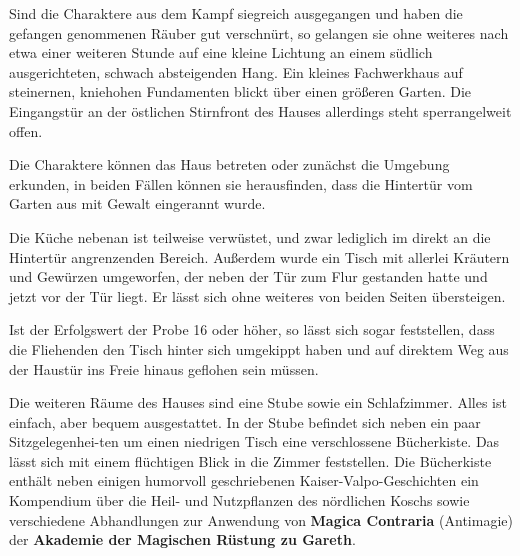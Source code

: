 



Sind die Charaktere aus dem Kampf siegreich ausgegangen und haben die gefangen genommenen Räuber gut verschnürt, so gelangen sie ohne weiteres nach etwa einer weiteren Stunde auf eine kleine Lichtung an einem südlich ausgerichteten, schwach absteigenden Hang. Ein kleines Fachwerkhaus auf steinernen, kniehohen Fundamenten blickt über einen größeren Garten. Die Eingangstür an der östlichen Stirnfront des Hauses allerdings steht sperrangelweit offen.


Die Charaktere können das Haus betreten oder zunächst die Umgebung erkunden, in beiden Fällen können sie herausfinden, dass die Hintertür vom Garten aus mit Gewalt eingerannt wurde.



Die Küche nebenan ist teilweise verwüstet, und zwar lediglich im direkt an die Hintertür angrenzenden Bereich. Außerdem wurde ein Tisch mit allerlei Kräutern und Gewürzen umgeworfen, der neben der Tür zum Flur gestanden hatte und jetzt vor der Tür liegt. Er lässt sich ohne weiteres von beiden Seiten übersteigen.


Ist der Erfolgswert der Probe 16 oder höher, so lässt sich sogar feststellen, dass die Fliehenden den Tisch hinter sich umgekippt haben und auf direktem Weg aus der Haustür ins Freie hinaus geflohen sein müssen. 


Die weiteren Räume des Hauses sind eine Stube sowie ein Schlafzimmer. Alles ist einfach, aber bequem ausgestattet. In der Stube befindet sich neben ein paar Sitzgelegenhei-ten um einen niedrigen Tisch eine verschlossene Bücherkiste. Das lässt sich mit einem flüchtigen Blick in die Zimmer feststellen. Die Bücherkiste enthält neben einigen humorvoll geschriebenen Kaiser-Valpo-Geschichten ein Kompendium über die Heil- und Nutzpflanzen des nördlichen Koschs sowie verschiedene Abhandlungen zur Anwendung von \textbf{Magica Contraria} (Antimagie) der \textbf{Akademie der Magischen Rüstung zu Gareth}.

